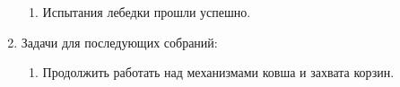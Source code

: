 \begin{enumerate}
\begin{enumerate}
	  \item	Испытания лебедки прошли успешно.\newline
	  
    \end{enumerate}
    
	\item Задачи для последующих собраний:\newline
	\begin{enumerate}
	  \item	Продолжить работать над механизмами ковша и захвата корзин.\newline
	  
    \end{enumerate}     
\end{enumerate}

\fillpage

